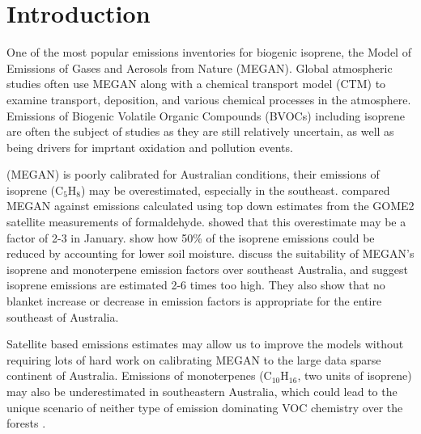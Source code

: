 \section{Introduction}  
\label{BioIsop:intro}  
  
  One of the most popular emissions inventories for biogenic isoprene, the Model of Emissions of Gases and Aerosols from Nature (MEGAN).
  Global atmospheric studies often use MEGAN along with a chemical transport model (CTM) to examine transport, deposition, and various chemical processes in the atmosphere.
  Emissions of Biogenic Volatile Organic Compounds (BVOCs) including isoprene are often the subject of studies as they are still relatively uncertain, as well as being drivers for imprtant oxidation and pollution events.
  
  (MEGAN) is poorly calibrated for Australian conditions, their emissions of isoprene (C$_5$H$_8$) may be overestimated, especially in the southeast.
  \cite{Muller2008} compared MEGAN against emissions calculated using top down estimates from the GOME2 satellite measurements of formaldehyde.
  \cite{Stavrakou2015} showed that this overestimate may be a factor of 2-3 in January.
  \cite{Sindelarova2014} show how 50\% of the isoprene emissions could be reduced by accounting for lower soil moisture.
  \cite{Emmerson2016} discuss the suitability of MEGAN's isoprene and monoterpene emission factors over southeast Australia, and suggest isoprene emissions are estimated 2-6 times too high.
  They also show that no blanket increase or decrease in emission factors is appropriate for the entire southeast of Australia.
  
  Satellite based emissions estimates may allow us to improve the models without requiring lots of hard work on calibrating MEGAN to the large data sparse continent of Australia.
  Emissions of monoterpenes (C$_10$H$_16$, two units of isoprene) may also be underestimated in southeastern Australia, which could lead to the unique scenario of neither type of emission dominating VOC chemistry over the forests \citep{Emmerson2016}.
  
